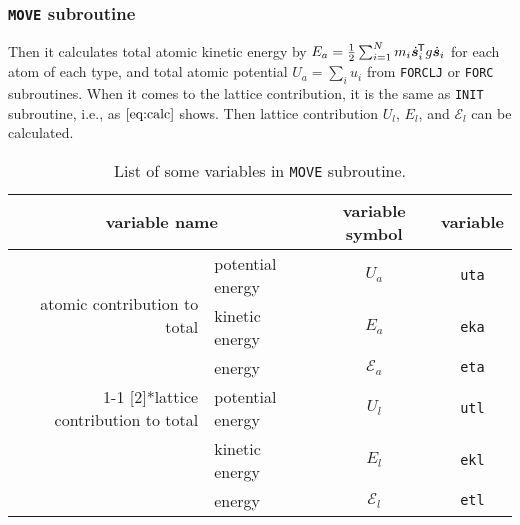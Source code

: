 
\subsubsection{\texttt{MOVE} subroutine}

Then it calculates total atomic kinetic energy by
$E_a = \frac{ 1 }{ 2 } \sum_{i=1}^{N} m_i \dot{ \bm{s} }_i ^{\mkern-1.5mu\mathsf{T}}
g \dot{ \bm{s} }_i$ for each atom of each type,
and total atomic potential $U_a = \sum_{i} u_i$ from \texttt{FORCLJ} or \texttt{FORC}
subroutines.
When it comes to the lattice contribution, it is the same as \texttt{INIT} subroutine,
i.e., as $\eqref{eq:calc}$ shows. Then lattice contribution $U_l$, $E_l$, and
$\mathscr{E}_l$ can be calculated.

\begin{table}[h]
	\centering
	\caption{List of some variables in \texttt{MOVE} subroutine.}
	\begin{tabular}{@{}rlcc@{}}
		\toprule
		\multicolumn{2}{c}{variable name} & variable symbol & variable \\
		\midrule
		\multirow{3}[2]{*}{atomic contribution to total}                                  & potential energy & $U_a$           & \texttt{uta} \\
		                                                                                  & kinetic energy   & $E_a$           & \texttt{eka} \\
		                                                                                  & energy           & $\mathscr{E}_a$ & \texttt{eta} \\
		\cmidrule{1-1}\cmidrule{4-4}    \multirow{3}[2]{*}{lattice contribution to total} & potential energy & $U_l$           & \texttt{utl} \\
		                                                                                  & kinetic energy   & $E_l$           & \texttt{ekl} \\
		                                                                                  & energy           & $\mathscr{E}_l$ & \texttt{etl} \\
		\bottomrule
	\end{tabular}
	\label{tab:move}%
\end{table}%
